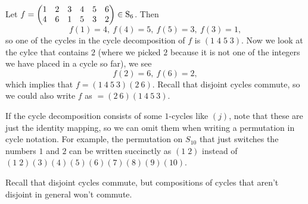 \documentclass[11pt,dvipsnames]{book}
\numberwithin{equation}{section} %
\numberwithin{figure}{section} %
\numberwithin{table}{section} %
\begin{document}
 \begin{example}  Let
$f=\left(\begin{matrix} %
1 & 2 & 3 & 4 & 5 & 6\cr%
4 & 6 & 1 & 5 & 3 & 2 \cr%
\end{matrix}\right)\in\mathrm{S}_{6}$.  Then
\[
f(1)=4,\  f(4)=5,\  f(5)=3,\  f(3)=1,
\]
so one of the cycles in the cycle decomposition of $f$ is $(1\; 4 \; 5 \; 3)$. Now we look at the cylce that contains $2$ (where we picked $2$ because it is not one of the integers we have placed in a cycle so far), we see
\[
f(2)=6,\  f(6)=2,
\]
 which implies that $f=(1\ 4\ 5\ 3)(2\ 6)$. Recall that disjoint cycles commute, so we could also write $f$ as $=(2\
6)(1\ 4\ 5\ 3)$.
\end{example}


If the cycle decomposition consists of some $1$-cycles like $(j)$, note that these are just the identity mapping, so we can omit them when writing a permutation in cycle notation. For example, the permutation on $S_{10}$ that just switches the numbers $1$ and $2$ can be written succinctly as $(1\; 2)$ instead of $(1 \; 2 ) (3)(4)(5)(6)(7)(8)(9)(10)$. 
%

Recall that disjoint cycles commute, but compositions of cycles that aren't disjoint in general won't commute. 
\end{document}

